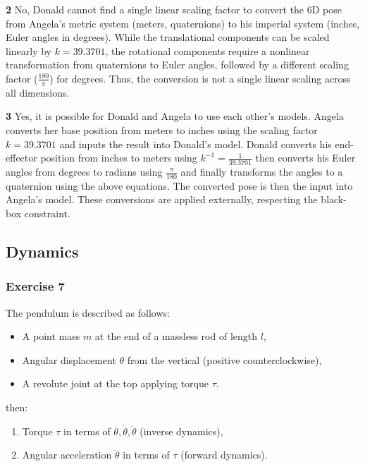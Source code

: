 \documentclass[12pt,a4paper]{article}
\begin{document}
\textbf{2} No, Donald cannot find a single linear scaling factor to convert the 6D pose from Angela’s metric system (meters, quaternions) to his imperial system (inches, Euler angles in degrees). While the translational components can be scaled linearly by $ k = 39.3701 $, the rotational components require a nonlinear transformation from quaternions to Euler angles, followed by a different scaling factor ($ \frac{180}{\pi} $) for degrees. Thus, the conversion is not a single linear scaling across all dimensions.

\textbf{3} Yes, it is possible for Donald and Angela to use each other’s models. Angela converts her base position from meters to inches using the scaling factor $ k = 39.3701 $ and inputs the result into Donald’s model. Donald converts his end-effector position from inches to meters using $ k^{-1} = \frac{1}{39.3701} $ then converts his Euler angles from degrees to radians using $ \frac{\pi}{180} $ and finally transforms the angles to a quaternion using the above equations. The converted pose is then the input into Angela’s model. These conversions are applied externally, respecting the black-box constraint.



\subsection{Dynamics}
\subsubsection*{Exercise 7}

The pendulum is described as follows:
\begin{itemize}
  \item A point mass \( m \) at the end of a massless rod of length \( l \),
  \item Angular displacement \( \theta \) from the vertical (positive counterclockwise),
  \item A revolute joint at the top applying torque \( \tau \).
\end{itemize}

then:
\begin{enumerate}
  \item Torque \( \tau \) in terms of \( \theta, \dot{\theta}, \ddot{\theta} \) (inverse dynamics),
  \item Angular acceleration \( \ddot{\theta} \) in terms of \( \tau \) (forward dynamics).
\end{enumerate}
\end{document}
